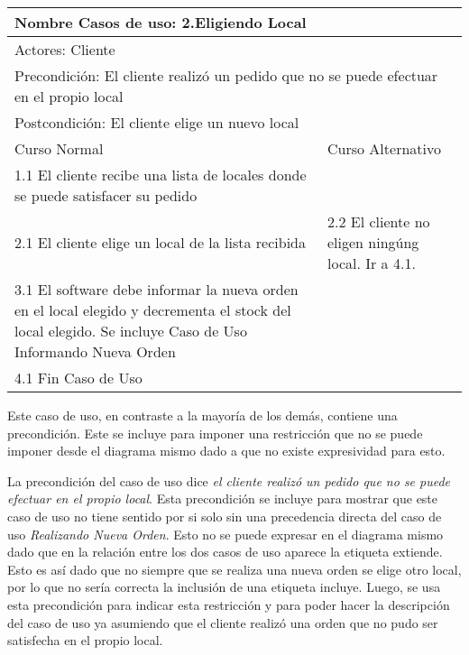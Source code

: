 \documentclass[a4paper,10pt]{article}
\begin{document}
\begin{center}
\begin{tabularx}{14cm}{|X|X|}
\hline
\multicolumn{2}{|l|}{Nombre Casos de uso: 2.Eligiendo Local}\\
\hline
\multicolumn{2}{|l|}{Actores: Cliente}\\
\hline
\multicolumn{2}{|l|}{Precondici\'on: El cliente realiz\'o un pedido que no se puede efectuar en el propio local}\\
\hline
\multicolumn{2}{|l|}{Postcondici\'on: El cliente elige un nuevo local}\\
\hline
Curso Normal & Curso Alternativo\\
\hline
1.1 El cliente recibe una lista de locales donde se puede satisfacer su pedido & 
\\
\hline
2.1 El cliente elige un local de la lista recibida & 2.2 El cliente no eligen ning\'ung local. Ir a 4.1.
\\
\hline
3.1 El software debe informar la nueva orden en el local elegido y decrementa el stock del local elegido. Se incluye Caso de Uso Informando Nueva Orden &
\\
\hline
4.1 Fin Caso de Uso &
\\
\hline
\end{tabularx}
\end{center}

Este caso de uso, en contraste a la mayor\'ia de los dem\'as, contiene una precondici\'on. Este se incluye para imponer una restricci\'on que no
se puede imponer desde el diagrama mismo dado a que no existe expresividad para esto. 

La precondici\'on del caso de uso dice \emph{el cliente realiz\'o un pedido que no se puede efectuar en el propio local}.
Esta precondici\'on se incluye para mostrar que este caso de uso no tiene sentido por si solo sin una precedencia directa del caso de uso
\emph{Realizando Nueva Orden}. Esto no se puede expresar en el diagrama mismo dado que  en la relaci\'on entre los dos casos de uso 
aparece la etiqueta extiende. Esto es as\'i dado que no siempre que se realiza una nueva orden se elige otro local, por lo que no ser\'ia correcta
la inclusi\'on de una etiqueta incluye. Luego, se usa esta precondici\'on para indicar esta restricci\'on y para poder hacer la descripci\'on del caso de uso
ya asumiendo que el cliente realiz\'o una orden que no pudo ser satisfecha en el propio local.

\bigskip
\end{document}
